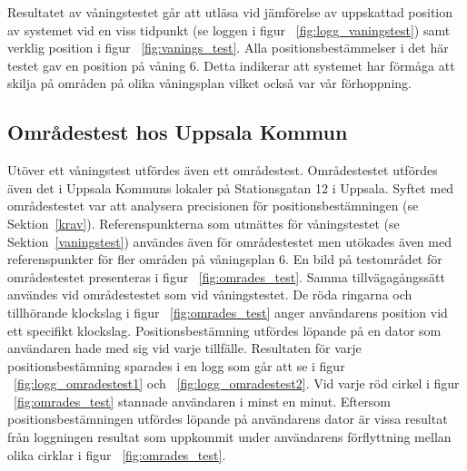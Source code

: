 \documentclass[a4paper,12pt]{article}
\begin{document}
 Resultatet av våningstestet går att utläsa vid jämförelse av uppskattad position av systemet vid en viss tidpunkt (se loggen i figur ~\ref{fig:logg_vaningstest}) samt verklig position i figur ~\ref{fig:vanings_test}. Alla positionsbestämmelser i det här testet gav en position på våning 6. Detta indikerar att systemet har förmåga att skilja på områden på olika våningsplan vilket också var vår förhoppning.

 \subsection{Områdestest hos Uppsala Kommun}
 Utöver ett våningstest utfördes även ett områdestest. Områdestestet utfördes även det i Uppsala Kommuns lokaler på Stationsgatan 12 i Uppsala. Syftet med områdestestet var att analysera precisionen för positionsbestämningen (se Sektion~\ref{krav}). Referenspunkterna som utmättes för våningstestet (se Sektion~\ref{vaningstest}) användes även för områdestestet men utökades även med referenspunkter för fler områden på våningsplan 6. En bild på testområdet för områdestestet presenteras i figur ~\ref{fig:omrades_test}. Samma tillvägagångssätt användes vid områdestestet som vid våningstestet. De röda ringarna och tillhörande klockslag i figur ~\ref{fig:omrades_test} anger användarens position vid ett specifikt klockslag. Positionsbestämning utfördes löpande på en dator som användaren hade med sig vid varje tillfälle. Resultaten för varje positionsbestämning sparades i en logg som går att se i figur ~\ref{fig:logg_omradestest1} och ~\ref{fig:logg_omradestest2}. Vid varje röd cirkel i figur ~\ref{fig:omrades_test} stannade användaren i minst en minut. Eftersom positionsbestämningen utfördes löpande på användarens dator är vissa resultat från loggningen resultat som uppkommit under användarens förflyttning mellan olika cirklar i figur ~\ref{fig:omrades_test}.
\end{document}
